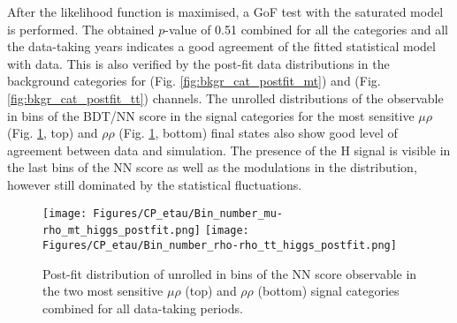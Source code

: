 After the likelihood function is maximised, a GoF test with the saturated model is performed. The obtained $p$-value of 0.51 combined for all the categories and all the data-taking years indicates a good agreement of the fitted statistical model with data. This is also verified by the post-fit data distributions in the background categories for \mt (Fig. \ref{fig:bkgr_cat_postfit_mt}) and \tata (Fig. \ref{fig:bkgr_cat_postfit_tt}) channels. The unrolled distributions of the \phicp observable in bins of the BDT/NN score in the signal categories for the most sensitive $\mu\rho$ (Fig. \ref{fig:sig_cat_postfit_comb}, top) and $\rho\rho$ (Fig. \ref{fig:sig_cat_postfit_comb}, bottom) final states also show good level of agreement between data and simulation. The presence of the H signal is visible in the last bins of the NN score as well as the modulations in the distribution, however still dominated by the statistical fluctuations.

\begin{figure}[h!]
    \centering
    \texttt{[image: Figures/CP\_etau/Bin\_number\_mu-rho\_mt\_higgs\_postfit.png]}
    \texttt{[image: Figures/CP\_etau/Bin\_number\_rho-rho\_tt\_higgs\_postfit.png]}
    \caption{Post-fit distribution of unrolled in bins of the NN score \phicp observable in the two most sensitive $\mu\rho$ (top) and $\rho\rho$ (bottom) signal categories combined for all data-taking periods.}
    \label{fig:sig_cat_postfit_comb}
\end{figure}


